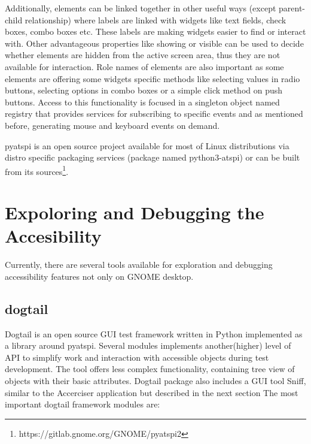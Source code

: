 Additionally, elements can be linked together in other useful ways (except parent-child relationship) where labels are linked with widgets like text fields, check boxes, combo boxes etc. These labels are making widgets easier to find or interact with. Other advantageous properties like showing or visible can be used to decide whether elements are hidden from the active screen area, thus they are not available for interaction. Role names of elements are also important as some elements are offering some widgets specific methods like selecting values in radio buttons, selecting options in combo boxes or a simple click method on push buttons. Access to this functionality is focused in a singleton object named registry that provides services for subscribing to specific events and as mentioned before, generating mouse and keyboard events on demand.

pyatspi is an open source project available for most of Linux distributions via distro specific packaging services (package named python3-atspi) or can be built from its sources\footnote{https://gitlab.gnome.org/GNOME/pyatspi2}.

\section{Expoloring and Debugging the Accesibility}
Currently, there are several tools available for exploration and debugging accessibility features not only on GNOME desktop. 
\subsection{dogtail}
Dogtail is an open source GUI test framework written in Python implemented as a library around pyatspi. Several modules implements another(higher) level of API to simplify work and interaction with accessible objects during test development. The tool offers less complex functionality, containing tree view of objects with their basic attributes\cite{dogtail_doc}. Dogtail package also includes a GUI tool Sniff, similar to the Accerciser application but described in the next section
The most important dogtail framework modules are:


